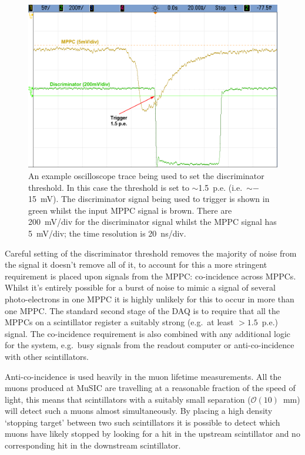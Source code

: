 \begin{figure}[hptb]
  \centering  
    \includegraphics[width=.9\textwidth]{images/edit/scope_dis_ch_2.png}
  \caption{An example oscilloscope trace being used to set the discriminator threshold. In this case the threshold is set to \( \sim \)1.5~p.e. (i.e.\ \( \sim- \)15~mV). The discriminator signal being used to trigger is shown in green whilst the input MPPC signal is brown. There are 200~mV/div for the discriminator signal whilst the MPPC signal has 5~mV/div; the time resolution is 20~ns/div.}
  \label{fig:set_dis_thrs_for_mppc}
\end{figure}

Careful setting of the discriminator threshold removes the majority of noise from the signal it doesn't remove all of it, to account for this a more stringent requirement is placed upon signals from the MPPC: co-incidence across MPPCs. Whilst it's entirely possible for a burst of noise to mimic a signal of several photo-electrons in one MPPC it is highly unlikely for this to occur in more than one MPPC. The standard second stage of the DAQ is to require that all the MPPCs on a scintillator register a suitably strong (e.g.\ at least \( >1.5\)~p.e.) signal. The co-incidence requirement is also combined with any additional logic for the system, e.g.\ busy signals from the readout computer or anti-co-incidence with other scintillators. 


Anti-co-incidence is used heavily in the muon lifetime measurements. All the muons produced at MuSIC are travelling at a reasonable fraction of the speed of light, this means that scintillators with a suitably small separation (\( \mathcal{O}(10)\)~mm) will detect such a muons almost simultaneously. By placing a high density `stopping target' between two such scintillators it is possible to detect which muons have likely stopped by looking for a hit in the upstream scintillator and no corresponding hit in the downstream scintillator. 

